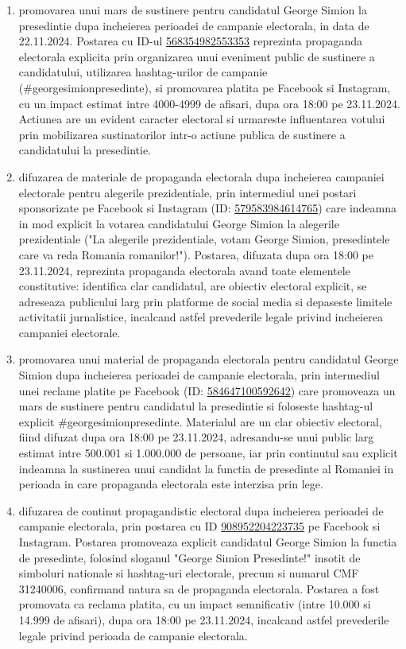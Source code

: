 \documentclass[a4paper,12pt]{article}
\begin{document}
\begin{enumerate}[leftmargin=*, label=\arabic*.)]
    \item promovarea unui mars de sustinere pentru candidatul George Simion la presedintie dupa incheierea perioadei de campanie electorala, in data de 22.11.2024. Postarea cu ID-ul \href{https://www.facebook.com/ads/library/?id=568354982553353}{568354982553353} reprezinta propaganda electorala explicita prin organizarea unui eveniment public de sustinere a candidatului, utilizarea hashtag-urilor de campanie (\#georgesimionpresedinte), si promovarea platita pe Facebook si Instagram, cu un impact estimat intre 4000-4999 de afisari, dupa ora 18:00 pe 23.11.2024. Actiunea are un evident caracter electoral si urmareste influentarea votului prin mobilizarea sustinatorilor intr-o actiune publica de sustinere a candidatului la presedintie.
    \item difuzarea de materiale de propaganda electorala dupa incheierea campaniei electorale pentru alegerile prezidentiale, prin intermediul unei postari sponsorizate pe Facebook si Instagram (ID: \href{https://www.facebook.com/ads/library/?id=579583984614765}{579583984614765}) care indeamna in mod explicit la votarea candidatului George Simion la alegerile prezidentiale ("La alegerile prezidentiale, votam George Simion, presedintele care va reda Romania romanilor!"). Postarea, difuzata dupa ora 18:00 pe 23.11.2024, reprezinta propaganda electorala avand toate elementele constitutive: identifica clar candidatul, are obiectiv electoral explicit, se adreseaza publicului larg prin platforme de social media si depaseste limitele activitatii jurnalistice, incalcand astfel prevederile legale privind incheierea campaniei electorale.
    \item promovarea unui material de propaganda electorala pentru candidatul George Simion dupa incheierea perioadei de campanie electorala, prin intermediul unei reclame platite pe Facebook (ID: \href{https://www.facebook.com/ads/library/?id=584647100592642}{584647100592642}) care promoveaza un mars de sustinere pentru candidatul la presedintie si foloseste hashtag-ul explicit \#georgesimionpresedinte. Materialul are un clar obiectiv electoral, fiind difuzat dupa ora 18:00 pe 23.11.2024, adresandu-se unui public larg estimat intre 500.001 si 1.000.000 de persoane, iar prin continutul sau explicit indeamna la sustinerea unui candidat la functia de presedinte al Romaniei in perioada in care propaganda electorala este interzisa prin lege.
    \item difuzarea de continut propagandistic electoral dupa incheierea perioadei de campanie electorala, prin postarea cu ID \href{https://www.facebook.com/ads/library/?id=908952204223735}{908952204223735} pe Facebook si Instagram. Postarea promoveaza explicit candidatul George Simion la functia de presedinte, folosind sloganul "George Simion Presedinte!" insotit de simboluri nationale si hashtag-uri electorale, precum si numarul CMF 31240006, confirmand natura sa de propaganda electorala. Postarea a fost promovata ca reclama platita, cu un impact semnificativ (intre 10.000 si 14.999 de afisari), dupa ora 18:00 pe 23.11.2024, incalcand astfel prevederile legale privind perioada de campanie electorala.

\end{enumerate}
\end{document}
